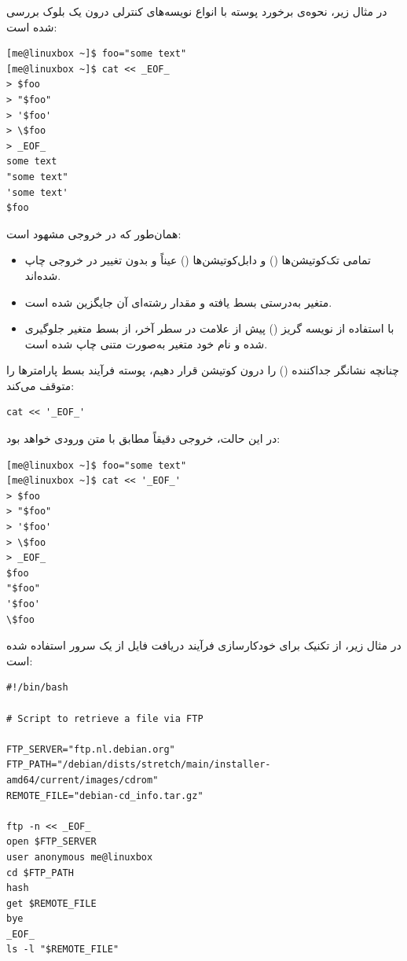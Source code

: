 در مثال زیر، نحوه‌ی برخورد پوسته با انواع نویسه‌های کنترلی درون یک بلوک  بررسی شده است:

\begin{latin}
\begin{lstlisting}
[me@linuxbox ~]$ foo="some text"
[me@linuxbox ~]$ cat << _EOF_
> $foo
> "$foo"
> '$foo'
> \$foo
> _EOF_
some text
"some text"
'some text'
$foo
\end{lstlisting}
\end{latin}

همان‌طور که در خروجی مشهود است:

\begin{itemize}
  \item تمامی تک‌کوتیشن‌ها () و دابل‌کوتیشن‌ها () عیناً و بدون تغییر در خروجی چاپ شده‌اند.
  \item متغیر  به‌درستی بسط یافته و مقدار رشته‌ای آن جایگزین شده است.
  \item با استفاده از نویسه گریز (\cmd{\textbackslash}) پیش از علامت \cmd{\$} در سطر آخر، از بسط متغیر جلوگیری شده و نام خود متغیر به‌صورت متنی چاپ شده است.
\end{itemize}

چنانچه نشانگر جداکننده () را درون کوتیشن قرار دهیم، پوسته فرآیند بسط پارامترها را متوقف می‌کند:

\begin{latin}
\begin{lstlisting}
cat << '_EOF_'
\end{lstlisting}
\end{latin}

در این حالت، خروجی دقیقاً مطابق با متن ورودی خواهد بود:

\begin{latin}
\begin{lstlisting}
[me@linuxbox ~]$ foo="some text"
[me@linuxbox ~]$ cat << '_EOF_'
> $foo
> "$foo"
> '$foo'
> \$foo
> _EOF_
$foo
"$foo"
'$foo'
\$foo
\end{lstlisting}
\end{latin}

در مثال زیر، از تکنیک  برای خودکارسازی فرآیند دریافت فایل از یک سرور  استفاده شده است:

\begin{latin}
\begin{lstlisting}
#!/bin/bash

# Script to retrieve a file via FTP

FTP_SERVER="ftp.nl.debian.org"
FTP_PATH="/debian/dists/stretch/main/installer-amd64/current/images/cdrom"
REMOTE_FILE="debian-cd_info.tar.gz"

ftp -n << _EOF_
open $FTP_SERVER
user anonymous me@linuxbox
cd $FTP_PATH
hash
get $REMOTE_FILE
bye
_EOF_
ls -l "$REMOTE_FILE"
\end{lstlisting}
\end{latin}

